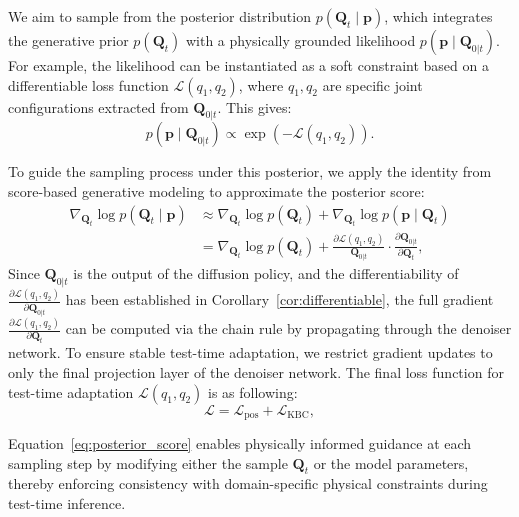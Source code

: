 \documentclass{article}
\begin{document}
We aim to sample from the posterior distribution $p(\bm{Q}_t \mid \bm{p})$, which integrates the generative prior $p(\bm{Q}_t)$ with a physically grounded likelihood $p(\bm{p} \mid \bm{Q}_{0|t})$. For example, the likelihood can be instantiated as a soft constraint based on a differentiable loss function $\mathcal{L}(q_1, q_2)$, where $q_1, q_2$ are specific joint configurations extracted from $\bm{Q}_{0|t}$. This gives:
\[
p(\bm{p} \mid \bm{Q}_{0|t}) \propto \exp\left(-\mathcal{L}(q_1, q_2)\right).
\]

To guide the sampling process under this posterior, we apply the identity from score-based generative modeling to approximate the posterior score:
\begin{equation}
\begin{aligned}
    \nabla_{\bm{Q}_t} \log p(\bm{Q}_t \mid \bm{p}) &\approx \nabla_{\bm{Q}_t} \log p(\bm{Q}_t) + \nabla_{\bm{Q}_{t}} \log p(\bm{p} \mid \bm{Q}_{t})\\
   & =\nabla_{\bm{Q}_t} \log p(\bm{Q}_t) +  \frac{\partial \mathcal{L}(q_1, q_2)}{\bm{Q}_{0|t}} \cdot \frac{\partial \bm{Q}_{0|t}}{\partial \bm{Q}_t},
\end{aligned}
\label{eq:posterior_score}
\end{equation}
Since $\bm{Q}_{0|t}$ is the output of the diffusion policy, and the differentiability of $\frac{\partial \mathcal{L}(q_1, q_2)}{\partial \bm{Q}_{0|t}}$ has been established in  Corollary~\ref{cor:differentiable}, the full gradient $\frac{\partial \mathcal{L}(q_1, q_2)}{\partial \bm{Q}_t}$ can be computed via the chain rule by propagating through the denoiser network. To ensure stable test-time adaptation, we restrict gradient updates to only the final projection layer of the denoiser network. The final loss function for test-time adaptation $\mathcal{L}(q_1, q_2)$ is as following:
\begin{equation}
\mathcal{L}= \mathcal{L}_{\text{pos}} + \mathcal{L}_{\text{KBC}},
\end{equation}

Equation~\ref{eq:posterior_score} enables physically informed guidance at each sampling step by modifying either the sample $\bm{Q}_t$ or the model parameters, thereby enforcing consistency with domain-specific physical constraints during test-time inference.
 
\end{document}
